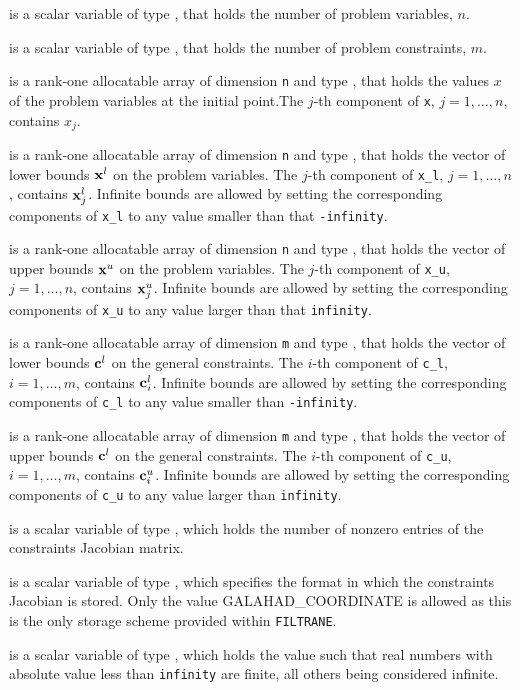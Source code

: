 \documentclass{galahad}
\newcommand{\packagename}{FILTRANE}
\newcommand{\sym}{\sf\small}
\newcommand{\filtrane}{{\tt \packagename}}
\begin{document}
\begin{description}
 is a scalar variable of type \integer, 
 that holds the number of problem variables, $n$.  

 is a scalar variable of type \integer, 
 that holds the number of problem constraints, $m$.

 is a rank-one allocatable array of dimension {\tt n} and type 
\realdp, that holds the values $x$ of the problem variables at the
initial point.The $j$-th component of {\tt x}, $j = 1,  \ldots , n$, contains
$x_{j}$.

 is a rank-one allocatable array of dimension {\tt n} and type 
\realdp, that holds
the vector of lower bounds ${\mathbf{x}}^l$ on the problem variables.
The $j$-th component of {\tt x\_l}, $j = 1, \ldots , n$, 
contains ${\mathbf{x}}^l_{j}$.
Infinite bounds are allowed by setting the corresponding 
components of {\tt x\_l} to any value smaller than that {\tt -infinity}.

 is a rank-one allocatable array of dimension {\tt n} and type 
\realdp, that holds
the vector of upper bounds ${\mathbf{x}}^u$ on the problem variables.
The $j$-th component of {\tt x\_u}, $j = 1, \ldots , n$, 
contains ${\mathbf{x}}^u_{j}$.
Infinite bounds are allowed by setting the corresponding 
components of {\tt x\_u} to any value larger than that {\tt infinity}.

 is a rank-one allocatable array of dimension {\tt m} and type 
\realdp, that holds the vector of lower bounds ${\mathbf{c}}^{l}$ 
on the general constraints. The $i$-th component of 
{\tt c\_l}, $i = 1, \ldots , m$, contains ${\mathbf{c}}_{i}^{l}$.
Infinite bounds are allowed by setting the corresponding 
components of {\tt c\_l} to any value smaller than {\tt -infinity}. 

 is a rank-one allocatable array of dimension {\tt m} and type 
\realdp, that holds the vector of upper bounds ${\mathbf{c}}^{l}$ 
on the general constraints. The $i$-th component of 
{\tt c\_u}, $i = 1, \ldots , m$, contains ${\mathbf{c}}_{i}^{u}$.
Infinite bounds are allowed by setting the corresponding 
components of {\tt c\_u} to any value larger than {\tt infinity}. 

 is a scalar variable of type \integer, 
which holds the number of nonzero entries of the constraints Jacobian matrix.

 is a scalar variable of type \integer, 
which specifies the format in which the constraints Jacobian is stored.
Only the value {\sym GALAHAD\_COORDINATE} is allowed as this is the only
storage scheme provided within \filtrane.

 is a scalar variable of type \realdp, which
holds the value such that real numbers with absolute value less than
{\tt infinity} are finite, all others being considered infinite.
\end{description}
\end{document}
